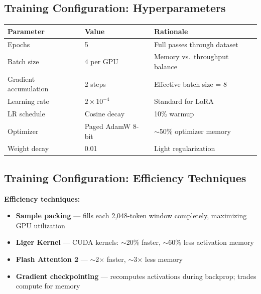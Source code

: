 \subsection{Training Configuration: Hyperparameters}
\begin{frame}{\insertsubsection}
  \footnotesize
  \setlength{\tabcolsep}{4pt}
  \begin{tabular}{p{} p{} p{}}
    \textbf{Parameter}         & \textbf{Value}    & \textbf{Rationale}             \\
    \hline
    Epochs                     & 5                 & Full passes through dataset    \\
    Batch size                 & 4 per GPU         & Memory vs.\ throughput balance \\
    Gradient accumulation      & 2 steps           & Effective batch size = 8       \\
    Learning rate              & $2\times10^{-4}$  & Standard for LoRA              \\
    LR schedule                & Cosine decay      & 10\% warmup                    \\
    Optimizer                  & Paged AdamW 8-bit & $\sim$50\% optimizer memory    \\
    Weight decay               & 0.01              & Light regularization           \\
  \end{tabular}
\end{frame}

\subsection{Training Configuration: Efficiency Techniques}
\begin{frame}{\insertsubsection}
  \textbf{Efficiency techniques:}
  \small\raggedright
  \begin{itemize}
    \item \textbf{Sample packing} --- fills each 2,048-token window completely,
          maximizing GPU utilization
    \item \textbf{Liger Kernel} --- CUDA kernels: $\sim$20\% faster,
          $\sim$60\% less activation memory
    \item \textbf{Flash Attention 2} --- $\sim$2$\times$ faster,
          $\sim$3$\times$ less memory
    \item \textbf{Gradient checkpointing} --- recomputes activations during
          backprop; trades compute for memory
  \end{itemize}
\end{frame}

